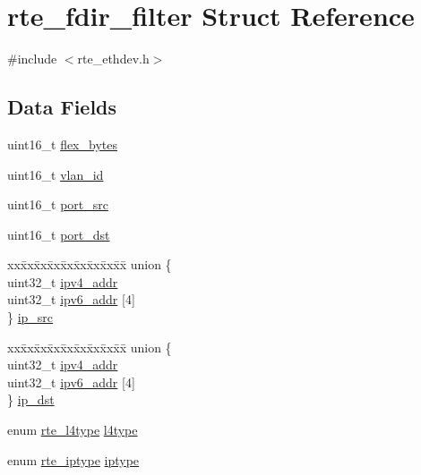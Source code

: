 \hypertarget{structrte__fdir__filter}{}\section{rte\+\_\+fdir\+\_\+filter Struct Reference}
\label{structrte__fdir__filter}


{\ttfamily \#include $<$rte\+\_\+ethdev.\+h$>$}

\subsection*{Data Fields}
\begin{DoxyCompactItemize}
\item 
uint16\+\_\+t \hyperlink{structrte__fdir__filter_a7eec7b6909117bd1391bf812aa0658af}{flex\+\_\+bytes}
\item 
uint16\+\_\+t \hyperlink{structrte__fdir__filter_ad9a532da576820f8630b96c16692aa5a}{vlan\+\_\+id}
\item 
uint16\+\_\+t \hyperlink{structrte__fdir__filter_ab1b9c69e1aa78a6c57cacf6afd7c3bc9}{port\+\_\+src}
\item 
uint16\+\_\+t \hyperlink{structrte__fdir__filter_aca5475783723cc06d0fb058080502033}{port\+\_\+dst}
\item 
\begin{tabbing}
xx\=xx\=xx\=xx\=xx\=xx\=xx\=xx\=xx\=\kill
union \{\\
\>uint32\_t \hyperlink{structrte__fdir__filter_a132e9dc13134d538f27e0d7fd09a7bc9}{ipv4\_addr}\\
\>uint32\_t \hyperlink{structrte__fdir__filter_a666af2f44468c2718d64b3e32bef3af6}{ipv6\_addr} \mbox{[}4\mbox{]}\\
\} \hyperlink{structrte__fdir__filter_ad00d8229fa71d4430e00fad6377b4f56}{ip\_src}\\

\end{tabbing}\item 
\begin{tabbing}
xx\=xx\=xx\=xx\=xx\=xx\=xx\=xx\=xx\=\kill
union \{\\
\>uint32\_t \hyperlink{structrte__fdir__filter_a132e9dc13134d538f27e0d7fd09a7bc9}{ipv4\_addr}\\
\>uint32\_t \hyperlink{structrte__fdir__filter_a666af2f44468c2718d64b3e32bef3af6}{ipv6\_addr} \mbox{[}4\mbox{]}\\
\} \hyperlink{structrte__fdir__filter_af50d026067facc14e9f59daabf3374d9}{ip\_dst}\\

\end{tabbing}\item 
enum \hyperlink{rte__ethdev_8h_a438bfb53a537ee87e81104affb6a0712}{rte\+\_\+l4type} \hyperlink{structrte__fdir__filter_a0d468c4d8e2f26e76d6a3b382714b111}{l4type}
\item 
enum \hyperlink{rte__ethdev_8h_ab3327734f777895234ece5ea5de0c780}{rte\+\_\+iptype} \hyperlink{structrte__fdir__filter_ac40152ee74c401e0f29eaa930ee7ea50}{iptype}
\end{DoxyCompactItemize}


